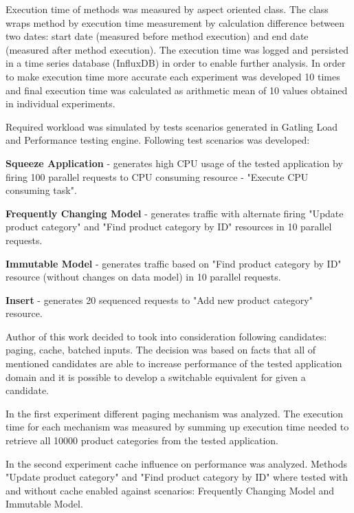 \documentclass[10pt,a4paper]{article}
\let\tempone\itemize
\let\temptwo\enditemize
\renewenvironment{itemize}{\tempone\addtolength{\itemsep}{-0.4\baselineskip}}{\temptwo}
\begin{document}
Execution time of methods was measured by aspect oriented class. The class wraps method by execution time measurement by calculation difference between two dates: start date (measured before method execution) and end date (measured after method execution). The execution time was logged and persisted in a time series database (InfluxDB) in order to enable further analysis. In order to make execution time more accurate each experiment was developed 10 times and final execution time was calculated as arithmetic mean of 10 values obtained in individual experiments. 

Required workload was simulated by tests scenarios generated in Gatling Load and Performance testing engine\cite{gatling}. Following test scenarios was developed:
\begin{itemize}
\item \textbf{Squeeze Application} - generates high CPU usage of the tested application by firing 100 parallel requests to CPU consuming resource - "Execute CPU consuming task". 
\item \textbf{Frequently Changing Model} - generates traffic with alternate firing  "Update product category" and "Find product category by ID" resources in 10 parallel requests.
\item \textbf{Immutable Model} - generates traffic based on "Find product category by ID" resource (without changes on data model) in 10 parallel requests.
\item \textbf{Insert} - generates 20 sequenced requests to "Add new product category" resource. 
\end{itemize}

Author of this work decided to took into consideration following candidates: paging, cache, batched inputs. The decision was based on facts that all of mentioned candidates are able to increase performance of the  tested application domain and it is possible to develop a switchable equivalent for given a candidate. 

In the first experiment different paging mechanism was analyzed. The execution time for each mechanism was measured by summing up execution time needed to retrieve all 10000 product categories from the tested application.   

In the second experiment cache influence on performance was analyzed. Methods "Update product category" and "Find product category by ID" where tested with and without cache enabled against scenarios: Frequently Changing Model and    Immutable Model. 
\end{document}

